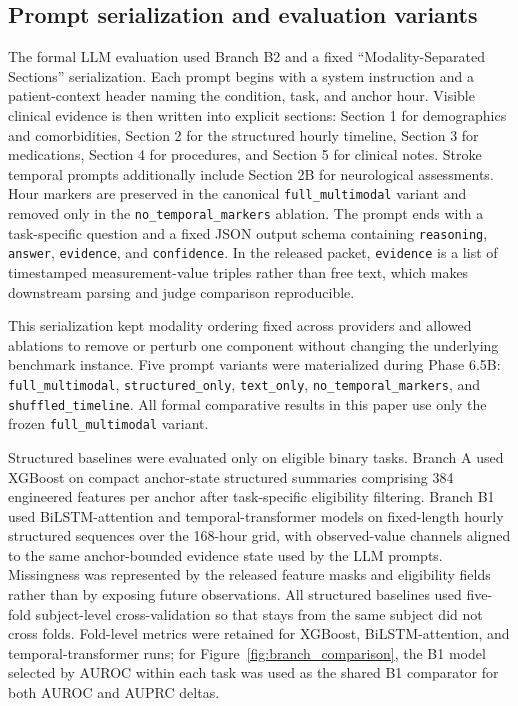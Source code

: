 \documentclass[pdflatex,sn-nature]{sn-jnl}
\begin{document}
\subsection{Prompt serialization and evaluation variants}

The formal LLM evaluation used Branch B2 and a fixed ``Modality-Separated Sections'' serialization. Each prompt begins with a system instruction and a patient-context header naming the condition, task, and anchor hour. Visible clinical evidence is then written into explicit sections: Section 1 for demographics and comorbidities, Section 2 for the structured hourly timeline, Section 3 for medications, Section 4 for procedures, and Section 5 for clinical notes. Stroke temporal prompts additionally include Section 2B for neurological assessments. Hour markers are preserved in the canonical \texttt{full\_multimodal} variant and removed only in the \texttt{no\_temporal\_markers} ablation. The prompt ends with a task-specific question and a fixed JSON output schema containing \texttt{reasoning}, \texttt{answer}, \texttt{evidence}, and \texttt{confidence}. In the released packet, \texttt{evidence} is a list of timestamped measurement-value triples rather than free text, which makes downstream parsing and judge comparison reproducible.

This serialization kept modality ordering fixed across providers and allowed ablations to remove or perturb one component without changing the underlying benchmark instance. Five prompt variants were materialized during Phase 6.5B: \texttt{full\_multimodal}, \texttt{structured\_only}, \texttt{text\_only}, \texttt{no\_temporal\_markers}, and \texttt{shuffled\_timeline}. All formal comparative results in this paper use only the frozen \texttt{full\_multimodal} variant.

Structured baselines were evaluated only on eligible binary tasks. Branch A used XGBoost on compact anchor-state structured summaries comprising 384 engineered features per anchor after task-specific eligibility filtering. Branch B1 used BiLSTM-attention and temporal-transformer models on fixed-length hourly structured sequences over the 168-hour grid, with observed-value channels aligned to the same anchor-bounded evidence state used by the LLM prompts. Missingness was represented by the released feature masks and eligibility fields rather than by exposing future observations. All structured baselines used five-fold subject-level cross-validation so that stays from the same subject did not cross folds. Fold-level metrics were retained for XGBoost, BiLSTM-attention, and temporal-transformer runs; for Figure~\ref{fig:branch_comparison}, the B1 model selected by AUROC within each task was used as the shared B1 comparator for both AUROC and AUPRC deltas.
\end{document}
